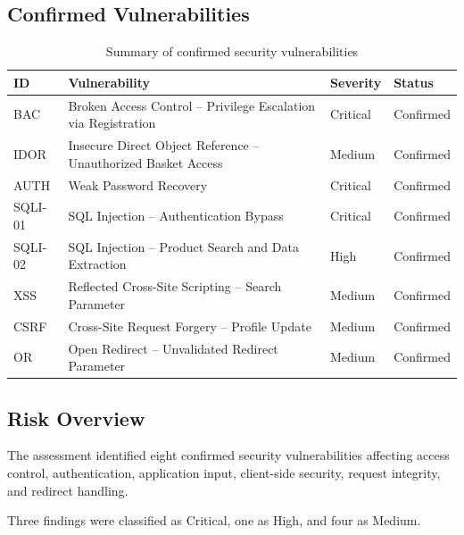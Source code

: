 \subsection*{Confirmed Vulnerabilities}

\begin{table}[H]
\centering
\begin{tabular}{|l|p{6cm}|l|l|}
\hline
\textbf{ID} & \textbf{Vulnerability} & \textbf{Severity} & \textbf{Status} \\
\hline

BAC &
Broken Access Control -- Privilege Escalation via Registration &
Critical &
Confirmed \\
\hline

IDOR &
Insecure Direct Object Reference -- Unauthorized Basket Access &
Medium &
Confirmed \\
\hline

AUTH &
Weak Password Recovery &
Critical &
Confirmed \\
\hline

SQLI-01 &
SQL Injection -- Authentication Bypass &
Critical &
Confirmed \\
\hline

SQLI-02 &
SQL Injection -- Product Search and Data Extraction &
High &
Confirmed \\
\hline

XSS &
Reflected Cross-Site Scripting -- Search Parameter &
Medium &
Confirmed \\
\hline

CSRF &
Cross-Site Request Forgery -- Profile Update &
Medium &
Confirmed \\
\hline

OR &
Open Redirect -- Unvalidated Redirect Parameter &
Medium &
Confirmed \\
\hline

\end{tabular}
\caption{Summary of confirmed security vulnerabilities}
\end{table}

\subsection*{Risk Overview}

The assessment identified eight confirmed security vulnerabilities
affecting access control, authentication, application input, client-side
security, request integrity, and redirect handling.

Three findings were classified as Critical, one as High, and four as
Medium.

